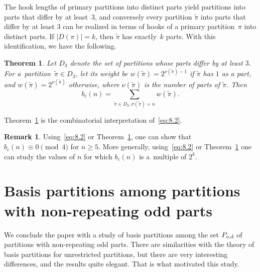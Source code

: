 \documentclass[pdftex]{sigma}
\numberwithin{equation}{section}
\newtheorem{Theorem}{Theorem}[section]
\theoremstyle{definition}
\newtheorem*{Remark*}{Remark}
\begin{document}
The hook lengths of primary partitions into distinct parts yield partitions
into parts that differ by at least~3, and conversely every partition
$\tilde\pi$ into parts that differ by at least 3 can be realized in terms of
hooks of a primary partition~$\pi$ into distinct parts. If $|D(\pi)|=k$,
then $\tilde\pi$ has exactly~$k$ parts. With this identification, we have the following.

\begin{Theorem}\label{thm:8}
Let $D_3$ denote the set of partitions whose
parts differ by at least $3$. For a~partition~$\tilde\pi\in D_3$, let
its weight be $w(\tilde\pi)=2^{\nu(\tilde\pi) -1}$
if $\tilde\pi$ has $1$ as a part, and
${w(\tilde\pi)=2^{\nu(\tilde\pi)}}$ otherwise, where $\nu(\tilde\pi)$
{{is the number of parts of}} $\tilde\pi$. Then
\[
b_c(n)=\sum_{\tilde\pi\in D_3, \sigma(\tilde\pi)=n}w(\tilde\pi).
\]
\end{Theorem}

Theorem~\ref{thm:8} is the combinatorial interpretation of~\eqref{eq:8.2}.

\begin{Remark*}
Using~\eqref{eq:8.2} or Theorem~\ref{thm:8}, one can show that
$b_c(n)\equiv 0 \pmod 4$ for $n\ge 5$.
More generally, using~\eqref{eq:8.2} or Theorem~\ref{thm:8} one can study the values of $n$ for
which $b_c(n)$ is a~multiple of $2^k$.
\end{Remark*}

\section[Basis partitions among partitions with non-repeating odd parts]{Basis partitions among partitions\\ with non-repeating odd parts}\label{section9}


We conclude the paper with a study of basis partitions among the set $P_{\rm o,d}$
of partitions with non-repeating odd parts. There are similarities with the
theory of basis partitions for unrestricted partitions, but there are very
interesting differences, and the results quite elegant. That is what motivated
this study.
\end{document}
